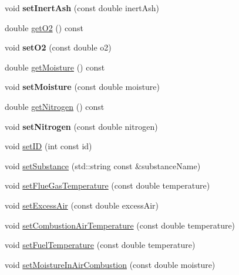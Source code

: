 \begin{DoxyCompactItemize}
void {\bfseries set\+Inert\+Ash} (const double inert\+Ash)
\item 
double \hyperlink{class_solid_liquid_flue_gas_material_a08d588e576f605d3f9925cb649e1105e}{get\+O2} () const
\item 
\mbox{\label{class_solid_liquid_flue_gas_material_afb57fdbeeccdb58fffec6d6446891409}} 
void {\bfseries set\+O2} (const double o2)
\item 
double \hyperlink{class_solid_liquid_flue_gas_material_accf3c8be942d0ba244f6eabab6e7012b}{get\+Moisture} () const
\item 
\mbox{\label{class_solid_liquid_flue_gas_material_ac811fd9fee43bc497dc53c1e55c17fea}} 
void {\bfseries set\+Moisture} (const double moisture)
\item 
double \hyperlink{class_solid_liquid_flue_gas_material_a76159a5d9d609f0e0131f7bca3b60ebc}{get\+Nitrogen} () const
\item 
\mbox{\label{class_solid_liquid_flue_gas_material_a7082dd41a06397a8ae714096c091bfbe}} 
void {\bfseries set\+Nitrogen} (const double nitrogen)
\item 
void \hyperlink{class_solid_liquid_flue_gas_material_a6046d06703bd496745121b62eab4f40f}{set\+ID} (int const id)
\item 
void \hyperlink{class_solid_liquid_flue_gas_material_a54be915432c1300c4d8eaf7bf2be361f}{set\+Substance} (std\+::string const \&substance\+Name)
\item 
void \hyperlink{class_solid_liquid_flue_gas_material_ae647700dbff5ccea7938b2117f2c3156}{set\+Flue\+Gas\+Temperature} (const double temperature)
\item 
void \hyperlink{class_solid_liquid_flue_gas_material_a7a3f9f77d267afc05f5fde1da9329ec5}{set\+Excess\+Air} (const double excess\+Air)
\item 
void \hyperlink{class_solid_liquid_flue_gas_material_a626dfbc9ba87abff99e5c5a8204d69c6}{set\+Combustion\+Air\+Temperature} (const double temperature)
\item 
void \hyperlink{class_solid_liquid_flue_gas_material_a420ba1234c5f8c4b93f190b61046a589}{set\+Fuel\+Temperature} (const double temperature)
\item 
void \hyperlink{class_solid_liquid_flue_gas_material_a1a5f1bd3008e78cce62edb8aca642284}{set\+Moisture\+In\+Air\+Combustion} (const double moisture)

\end{DoxyCompactItemize}
